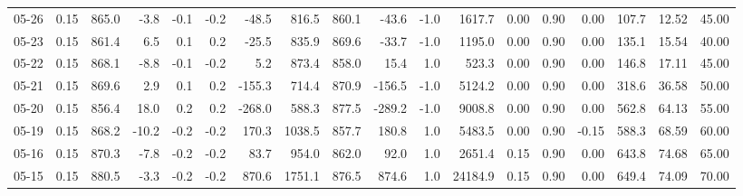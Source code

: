 \begin{threeparttable}
{\begin{tabular}{lrrrrrrrrrrrrrrrrr}
  05-26 &     0.15 & 865.0 &              -3.8 &              -0.1 &               -0.2 &              -48.5 &  816.5 & 860.1 &      -43.6 &                     -1.0 &              1617.7 &       0.00 &      0.90 &           0.00 &            107.7 &           12.52 &                  45.00 \\
  05-23 &     0.15 & 861.4 &               6.5 &               0.1 &                0.2 &              -25.5 &  835.9 & 869.6 &      -33.7 &                     -1.0 &              1195.0 &       0.00 &      0.90 &           0.00 &            135.1 &           15.54 &                  40.00 \\
  05-22 &     0.15 & 868.1 &              -8.8 &              -0.1 &               -0.2 &                5.2 &  873.4 & 858.0 &       15.4 &                      1.0 &               523.3 &       0.00 &      0.90 &           0.00 &            146.8 &           17.11 &                  45.00 \\
  05-21 &     0.15 & 869.6 &               2.9 &               0.1 &                0.2 &             -155.3 &  714.4 & 870.9 &     -156.5 &                     -1.0 &              5124.2 &       0.00 &      0.90 &           0.00 &            318.6 &           36.58 &                  50.00 \\
  05-20 &     0.15 & 856.4 &              18.0 &               0.2 &                0.2 &             -268.0 &  588.3 & 877.5 &     -289.2 &                     -1.0 &              9008.8 &       0.00 &      0.90 &           0.00 &            562.8 &           64.13 &                  55.00 \\
  05-19 &     0.15 & 868.2 &             -10.2 &              -0.2 &               -0.2 &              170.3 & 1038.5 & 857.7 &      180.8 &                      1.0 &              5483.5 &       0.00 &      0.90 &          -0.15 &            588.3 &           68.59 &                  60.00 \\
  05-16 &     0.15 & 870.3 &              -7.8 &              -0.2 &               -0.2 &               83.7 &  954.0 & 862.0 &       92.0 &                      1.0 &              2651.4 &       0.15 &      0.90 &           0.00 &            643.8 &           74.68 &                  65.00 \\
  05-15 &     0.15 & 880.5 &              -3.3 &              -0.2 &               -0.2 &              870.6 & 1751.1 & 876.5 &      874.6 &                      1.0 &             24184.9 &       0.15 &      0.90 &           0.00 &            649.4 &           74.09 &                  70.00 \\

\end{tabular}}
\end{threeparttable}
